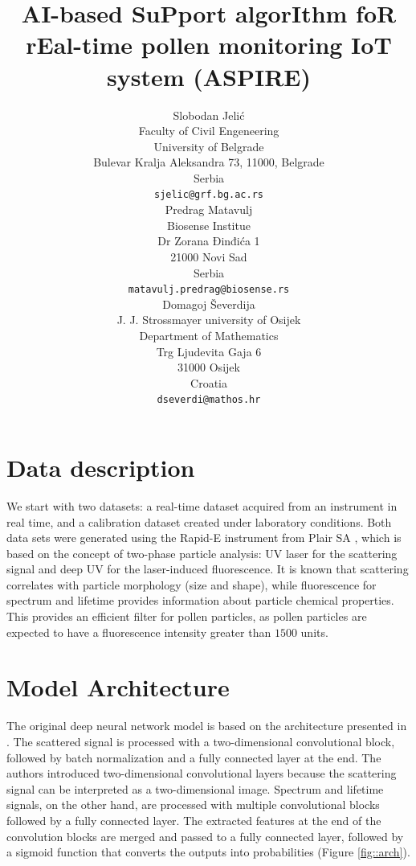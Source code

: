 \documentclass{article}
\title{AI-based SuPport algorIthm foR rEal-time pollen monitoring IoT system (ASPIRE)}
\author{
 Slobodan Jelić \\
  Faculty of Civil Engeneering\\
  University of Belgrade\\
  Bulevar Kralja Aleksandra 73,
  11000, Belgrade \\
  Serbia\\
  \texttt{sjelic@grf.bg.ac.rs} \\
   \And
 Predrag Matavulj \\
  Biosense Institue\\
  Dr Zorana Đinđića 1\\
  21000 Novi Sad\\
  Serbia\\
  \texttt{matavulj.predrag@biosense.rs} \\
  \And
 Domagoj Ševerdija \\
  J. J. Strossmayer university of Osijek\\
  Department of Mathematics\\
  Trg Ljudevita Gaja 6 \\
  31000 Osijek\\
  Croatia\\
  \texttt{dseverdi@mathos.hr}
}
\begin{document}
\maketitle




\section{Data description}

We start with two datasets: a real-time dataset acquired from an instrument in real time, and a calibration dataset created under laboratory conditions. Both data sets were generated using the Rapid-E instrument from Plair SA \cite{kiselev_flash-lamp_2013}, which is based on the concept of two-phase particle analysis: UV laser for the scattering signal and deep UV for the laser-induced fluorescence. It is known that scattering correlates with particle morphology (size and shape), while fluorescence for spectrum and lifetime provides information about particle chemical properties. This provides an efficient filter for pollen particles, as pollen particles are expected to have a fluorescence intensity greater than $1500$ units.

\section{Model Architecture}

The original deep neural network model is based on the architecture presented in \cite{sauliene_automatic_2019}. The scattered signal is processed with a two-dimensional convolutional block, followed by batch normalization and a fully connected layer at the end. The authors introduced two-dimensional convolutional layers because the scattering signal can be interpreted as a two-dimensional image. Spectrum and lifetime signals, on the other hand, are processed with multiple convolutional blocks followed by a fully connected layer. The extracted features at the end of the convolution blocks are merged and passed to a fully connected layer, followed by a sigmoid function that converts the outputs into probabilities (Figure \ref{fig::arch}).
\end{document}
